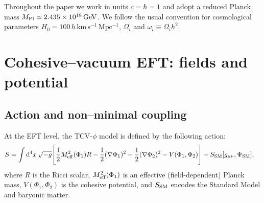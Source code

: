 \documentclass[aps,prd,onecolumn,nofootinbib,superscriptaddress]{revtex4-2}
\newcommand{\Mpl}{M_{\rm Pl}}
\newcommand{\Meff}{M_{\rm eff}}
\newcommand{\dd}{\mathrm{d}}
\begin{document}
Throughout the paper we work in units $c=\hbar=1$ and adopt a reduced Planck mass $\Mpl \simeq 2.435\times 10^{18}\,\mathrm{GeV}$.
We follow the usual convention for cosmological parameters $H_0=100\,h\,\mathrm{km\,s^{-1}\,Mpc^{-1}}$, $\Omega_i$ and $\omega_i\equiv\Omega_i h^2$.

\section{Cohesive--vacuum EFT: fields and potential}
\label{sec:EFT}

\subsection{Action and non--minimal coupling}

At the EFT level, the TCV-$\phi$ model is defined by the following action:
\begin{align}
  S &= \int \dd^4x\,\sqrt{-g}
  \Bigg[
    \frac{1}{2}\Meff^2(\Phi_1) R
    - \frac{1}{2}(\nabla\Phi_1)^2
    - \frac{1}{2}(\nabla\Phi_2)^2
    - V(\Phi_1,\Phi_2)
  \Bigg]
  + S_{\rm SM}[g_{\mu\nu},\Psi_{\rm SM}],
  \label{eq:action}
\end{align}
where $R$ is the Ricci scalar, $\Meff^2(\Phi_1)$ is an effective (field-dependent) Planck mass, $V(\Phi_1,\Phi_2)$ is the cohesive potential, and $S_{\rm SM}$ encodes the Standard Model and baryonic matter.
\end{document}
